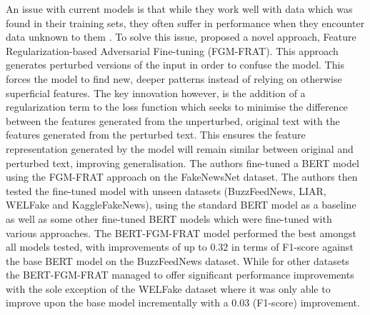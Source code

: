 \documentclass[stu,12pt,floatsintext,donotrepeattitle]{apa7}
\begin{document}
An issue with current models is that while they work well with data which was found in their training sets, they often suffer in performance when they encounter data unknown to them \parencite{BERT-finetuning}. To solve this issue, \textcite{BERT-finetuning} proposed a novel approach, Feature Regularization-based Adversarial Fine-tuning (FGM-FRAT). This approach generates perturbed versions of the input in order to confuse the model. This forces the model to find new, deeper patterns instead of relying on otherwise superficial features. The key innovation however, is the addition of a regularization term to the loss function which seeks to minimise the difference between the features generated from the unperturbed, original text with the features generated from the perturbed text. This ensures the feature representation generated by the model will remain similar between original and perturbed text, improving generalisation. The authors fine-tuned a BERT model using the FGM-FRAT approach on the FakeNewsNet dataset. The authors then tested the fine-tuned model with unseen datasets (BuzzFeedNews, LIAR, WELFake and KaggleFakeNews), using the standard BERT model as a baseline as well as some other fine-tuned BERT models which were fine-tuned with various approaches. The BERT-FGM-FRAT model performed the best amongst all models tested, with improvements of up to 0.32 in terms of F1-score against the base BERT model on the BuzzFeedNews dataset. While for other datasets the BERT-FGM-FRAT managed to offer significant performance improvements with the sole exception of the WELFake dataset where it was only able to improve upon the base model incrementally with a 0.03 (F1-score) improvement. 
\end{document}
